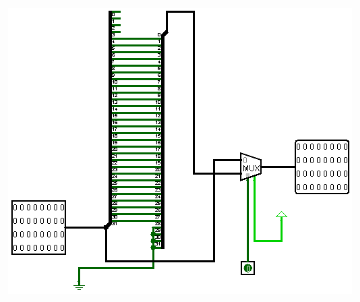 \documentclass[a4paper,12pt]{article}
\begin{document}
\begin{figure}[H]
    \hfill
    \begin{subfigure}[b]{0.3\textwidth}
        \centering
        \includegraphics[width=\linewidth]{4 bit rightShifter.png}
    \end{subfigure}
    \newline
    \newline
    \vspace{1em}


\end{figure}
\end{document}
